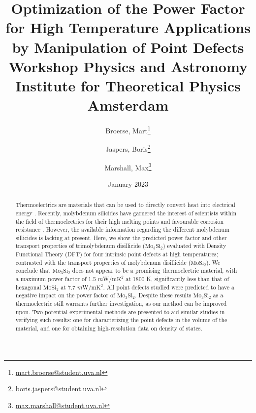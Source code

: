 \documentclass[7.5pt]{article}
\author{
	Broerse, Mart\thanks{\href{mailto:mart.broerse@student.uva.nl}{mart.broerse@student.uva.nl}}\\
	\and
	Jaspers, Boris\thanks{\href{mailto:boris.jaspers@student.uva.nl}{boris.jaspers@student.uva.nl}}\\
	\and
	Marshall, Max\thanks{\href{mailto:max.marshall@student.uva.nl}{max.marshall@student.uva.nl}}
}
\title{%
  Optimization of the Power Factor for High Temperature Applications by Manipulation of Point Defects \\
  \large Workshop Physics and Astronomy \\ Institute for Theoretical Physics Amsterdam}
\date{January 2023}
\theoremstyle{plain}
\theoremstyle{definition}
\newcommand{\<}{\langle}
\renewcommand{\>}{\rangle}
\begin{document}
\maketitle


\begin{abstract}
\noindent Thermoelectrics are materials that can be used to directly convert heat into electrical energy \cite{CHAMPIER2017167}.
Recently, molybdenum silicides have garnered the interest of scientists within the field of thermoelectrics for their high melting points and favourable corrosion resistance \cite{Lian2009}. 
However, the available information regarding the different molybdenum sillicides is lacking at present.
Here, we show the predicted power factor and other transport properties of trimolybdenum disillicide ($\text{Mo}_3\text{Si}_2$) evaluated with Density Functional Theory (DFT) for four intrinsic point defects at high temperatures; contrasted with the transport properties of molybdenum disillicide ($\text{Mo}\text{Si}_2$).
We conclude that $\text{Mo}_3\text{Si}_2$ does not appear to be a promising thermoelectric material, with a maximum power factor of 1.5 $m$W/m\cdot $\text{K}^2$ at 1800 K, significantly less than that of hexagonal $\text{MoSi}_2$ at 7.7 $m$W/m\cdot $\text{K}^2$. 
All point defects studied were predicted to have a negative impact on the power factor of $\text{Mo}_3\text{Si}_2$. 
Despite these results $\text{Mo}_3\text{Si}_2$ as a thermoelectric still warrants further investigation, as our method can be improved upon.
Two potential experimental methods are presented to aid similar studies in verifying such results: one for characterizing the point defects in the volume of the material, and one for obtaining high-resolution data on density of states. 

\end{abstract}
\end{document}
